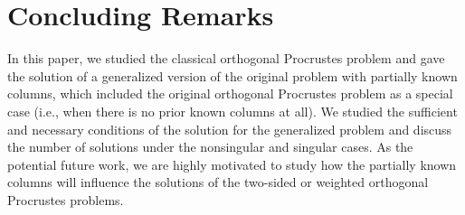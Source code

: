\documentclass[titlepage,11pt,twoside]{article}
\begin{document}







\section{Concluding Remarks}
In this paper, we studied the classical orthogonal Procrustes problem and gave the solution of a generalized version of the original problem with partially known columns, which included the original orthogonal Procrustes problem as a special case (i.e., when there is no prior known columns at all). We studied the sufficient and necessary conditions of the solution for the generalized problem and discuss the number of solutions under the nonsingular and singular cases. As the potential future work, we are highly motivated to study how the partially known columns will influence the solutions of the two-sided \cite{schonemann1968two} or weighted \cite{Lissitz1976,Koschat1991} orthogonal Procrustes problems.




\end{document}

